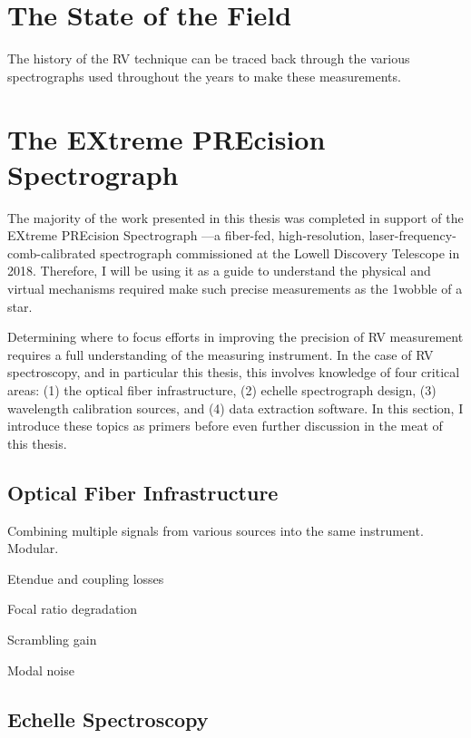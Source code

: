 \section{The State of the Field}

The history of the RV technique can be traced back through the various spectrographs used throughout the years to make these measurements. 


\section{The EXtreme PREcision Spectrograph} \label{intro:expres}

The majority of the work presented in this thesis was completed in support of the EXtreme PREcision Spectrograph \citep{jurgenson_expres_2016, blackman_performance_2020, petersburg_extreme-precision_2020}---a fiber-fed, high-resolution, laser-frequency-comb-calibrated spectrograph commissioned at the Lowell Discovery Telescope in 2018. Therefore, I will be using it as a guide to understand the physical and virtual mechanisms required make such precise measurements as the 1\ms wobble of a star.

Determining where to focus efforts in improving the precision of RV measurement requires a full understanding of the measuring instrument. In the case of RV spectroscopy, and in particular this thesis, this involves knowledge of four critical areas: (1) the optical fiber infrastructure, (2) echelle spectrograph design, (3) wavelength calibration sources, and (4) data extraction software. In this section, I introduce these topics as primers before even further discussion in the meat of this thesis.

\subsection{Optical Fiber Infrastructure} \label{intro:optics:fiber}



Combining multiple signals from various sources into the same instrument. Modular.

Etendue and coupling losses

Focal ratio degradation

Scrambling gain

Modal noise

\subsection{Echelle Spectroscopy} \label{intro:optics:echelle}

